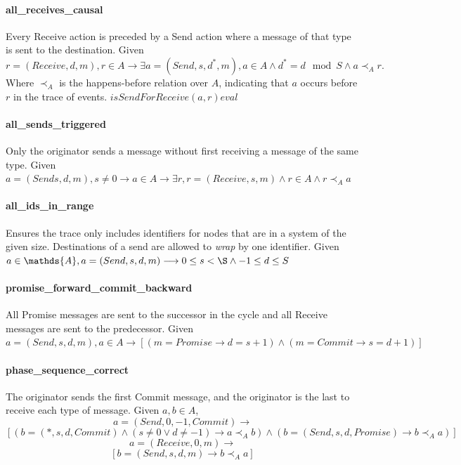 \documentclass[runningheads]{llncs}
\newcommand{\action}{\mathds{A}}
\newcommand{\happensbefore}{\prec_A}
\begin{document}
\paragraph{all\_receives\_causal} Every Receive action is preceded by a Send action where a message of that type is sent to the destination. Given $r = (Receive, d, m), r \in A \longrightarrow \exists a = (Send, s, d^*, m), a \in A \wedge d^* = d \mod S \wedge a \happensbefore r.$ Where $\happensbefore$ is the happens-before relation over $A$, indicating that $a$ occurs before $r$ in the trace of events. $isSendForReceive(a, r) eval$
\paragraph{all\_sends\_triggered} Only the originator sends a message without first receiving a message of the same type. 
Given $a = (Send s, d, m), s \neq 0 \longrightarrow a \in A \longrightarrow \exists r, r = (Receive, s, m) \wedge r \in A \wedge r \happensbefore a$
\paragraph{all\_ids\_in\_range} Ensures the trace only includes identifiers for nodes that are in a system of the given size. Destinations of a send are allowed to \emph{wrap} by one identifier. Given $a \in \action, a = (Send, s, d, m) \longrightarrow 0 \le s < \S \wedge -1 \le d \le S$
\paragraph{promise\_forward\_commit\_backward} All Promise messages are sent to the successor in the cycle and all Receive messages are sent to the predecessor. Given $a = (Send, s, d, m), a \in A \longrightarrow [(m = Promise \longrightarrow d = s + 1) \wedge (m = Commit \longrightarrow s = d + 1)]$
\paragraph{phase\_sequence\_correct} The originator sends the first Commit message, and the originator is the last to receive each type of message. Given $a, b \in A$,
$$ 
a = (Send, 0, -1, Commit) \longrightarrow 
$$
$$
[
(b = (*, s, d, Commit) \wedge (s \neq 0 \vee d \neq -1) \longrightarrow a \happensbefore b)
\wedge 
(b = (Send, s, d, Promise) \longrightarrow b \happensbefore a)
]
$$
$$
a = (Receive, 0, m) \longrightarrow 
$$
$$
[
b = (Send, s, d, m) \longrightarrow b \happensbefore a
]
$$
\end{document}

